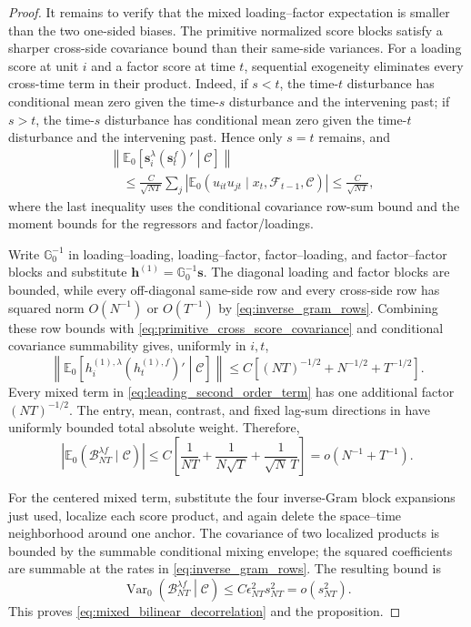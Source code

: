 \documentclass[11pt]{article}
\numberwithin{equation}{section}
\theoremstyle{remark}
\newcommand{\Ezero}{\mathbb E_0}
\begin{document}
\begin{proof}
It remains to verify that the mixed loading--factor expectation is smaller
than the two one-sided biases. The primitive normalized score blocks satisfy
a sharper cross-side covariance bound than their same-side variances. For a
loading score at unit $i$ and a factor score at time $t$, sequential
exogeneity eliminates every cross-time term in their product. Indeed, if
$s<t$, the time-$t$ disturbance has conditional mean zero given the
time-$s$ disturbance and the intervening past; if $s>t$, the time-$s$
disturbance has conditional mean zero given the time-$t$ disturbance and
the intervening past. Hence only $s=t$ remains, and
\begin{align}
&\left\|
\Ezero\!\left[
\bm s_i^\lambda(\bm s_t^f)'
\middle|\mathscr C
\right]
\right\|
\nonumber\\
&\quad\le
\frac{C}{\sqrt{NT}}
\sum_j
\left|
\Ezero(u_{it}u_{jt}\mid
x_t,\mathscr F_{t-1},\mathscr C)
\right|
\le
\frac{C}{\sqrt{NT}},
\label{eq:primitive_cross_score_covariance}
\end{align}
where the last inequality uses the conditional covariance row-sum bound and
the moment bounds for the regressors and factor/loadings.

Write $\mathbb G_0^{-1}$ in loading--loading, loading--factor,
factor--loading, and factor--factor blocks and substitute
$\bm h^{(1)}=\mathbb G_0^{-1}\bm s$. The diagonal loading and factor blocks
are bounded, while every off-diagonal same-side row and every cross-side
row has squared norm $O(N^{-1})$ or $O(T^{-1})$ by
\eqref{eq:inverse_gram_rows}. Combining these row bounds with
\eqref{eq:primitive_cross_score_covariance} and conditional covariance
summability gives, uniformly in $i,t$,
$$
\left\|
\Ezero\!\left[
h_i^{(1),\lambda}(h_t^{(1),f})'
\middle|\mathscr C
\right]
\right\|
\le
C\left[
(NT)^{-1/2}
+
N^{-1/2}
+
T^{-1/2}
\right].
$$
Every mixed term in \eqref{eq:leading_second_order_term} has one additional
factor $(NT)^{-1/2}$. The entry, mean, contrast, and fixed lag-sum
directions in  have uniformly bounded total absolute
weight. Therefore,
$$
\left|
\Ezero(\mathcal B_{NT}^{\lambda f}\mid\mathscr C)
\right|
\le
C\left[
\frac1{NT}
+
\frac1{N\sqrt T}
+
\frac1{\sqrt N\,T}
\right]
=
o(N^{-1}+T^{-1}).
$$

For the centered mixed term, substitute the four inverse-Gram block
expansions just used, localize each score product, and again delete the
space--time neighborhood around one anchor. The covariance of two
localized products is bounded by the summable conditional mixing envelope;
the squared coefficients are summable at the rates in
\eqref{eq:inverse_gram_rows}. The resulting bound is
$$
\operatorname{Var}_0\!\left(
\mathcal B_{NT}^{\lambda f}
\middle|\mathscr C
\right)
\le
C\epsilon_{NT}^2s_{NT}^2
=
o(s_{NT}^2).
$$
This proves \eqref{eq:mixed_bilinear_decorrelation} and the proposition.
\end{proof}
\end{document}
